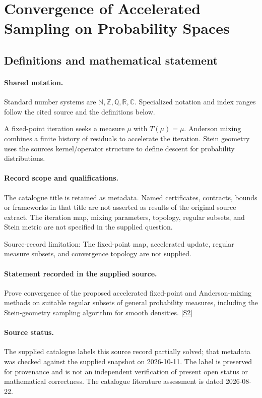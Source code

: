\documentclass[11pt]{article}
\newcommand{\sref}[2]{\hyperlink{source:#1:#2}{[S#2]}}
\begin{document}
\section{Convergence of Accelerated Sampling on Probability Spaces}\label{statement}

\subsection{Definitions and mathematical statement}

\paragraph{Shared notation.}Standard number systems are $\mathbb N,\mathbb Z,\mathbb Q,\mathbb R,\mathbb C$. Specialized notation and index ranges follow the cited source and the definitions below.


A fixed-point iteration seeks a measure $\mu$ with $T(\mu)=\mu$. Anderson mixing combines a finite history of residuals to accelerate the iteration. Stein geometry uses the source\textquotesingle s kernel/operator structure to define descent for probability distributions.
\paragraph{Record scope and qualifications.}
The catalogue title is retained as metadata. Named certificates, contracts, bounds or frameworks in that title are not asserted as results of the original source extract.
The iteration map, mixing parameters, topology, regular subsets, and Stein metric are not specified in the supplied question.

Source-record limitation: The fixed-point map, accelerated update, regular measure subsets, and convergence topology are not supplied.
\paragraph{Statement recorded in the supplied source.}
Prove convergence of the proposed accelerated fixed-point and Anderson-mixing methods on suitable regular subsets of general probability measures, including the Stein-geometry sampling algorithm for smooth densities. \sref{statement}{2}
\paragraph{Source status.}
The supplied catalogue labels this source record partially solved; that metadata was checked against the supplied snapshot on 2026-10-11. The label is preserved for provenance and is not an independent verification of present open status or mathematical correctness. The catalogue literature assessment is dated 2026-08-22.
\end{document}
